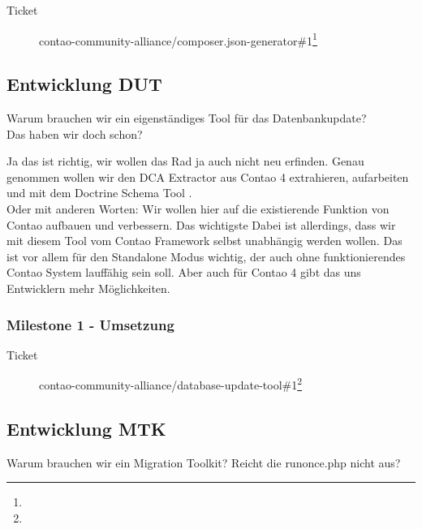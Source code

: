\documentclass[
paper=a4,
draft=false,%
fontsize=10pt%
]{scrartcl}
\begin{document}
\begin{description}
\item[Ticket] contao-community-alliance/composer.json-generator\#1\footnote{}
\end{description}

\subsection{Entwicklung DUT}
\label{subsec:dut}

\begin{emquotation}
Warum brauchen wir ein eigenständiges Tool für das Datenbankupdate? \\
\hspace*{\fill}Das haben wir doch schon?
\end{emquotation}

Ja das ist richtig, wir wollen das Rad ja auch nicht neu erfinden. Genau genommen wollen wir den DCA Extractor aus Contao 4 extrahieren, aufarbeiten und mit dem Doctrine Schema Tool .\\
Oder mit anderen Worten: Wir wollen hier auf die existierende Funktion von Contao aufbauen und verbessern. Das wichtigste Dabei ist allerdings, dass wir mit diesem Tool vom Contao Framework selbst unabhängig werden wollen. Das ist vor allem für den Standalone Modus wichtig, der auch ohne funktionierendes Contao System lauffähig sein soll. Aber auch für Contao 4 gibt das uns Entwicklern mehr Möglichkeiten.

\subsubsection{Milestone 1 - Umsetzung}
\label{subsec:dut-milestone-1}

\begin{description}
\item[Ticket] contao-community-alliance/database-update-tool\#1\footnote{}
\end{description}

\subsection{Entwicklung MTK}
\label{subsec:mtk}

\begin{emquotation}
Warum brauchen wir ein Migration Toolkit? Reicht die runonce.php nicht aus?
\end{emquotation}
\end{document}
